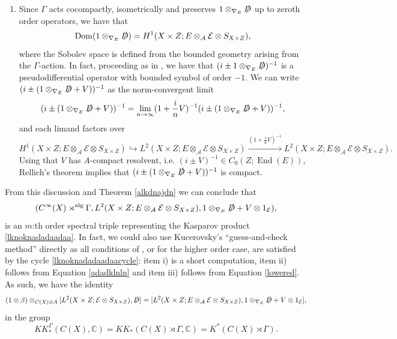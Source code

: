 \documentclass[a4paper,reqno]{amsart}
\numberwithin{equation}{section}
\def\End{\operatorname{End}}
\def\Dom{\operatorname{Dom}}
\def\C{\mathbb{C}}
\theoremstyle{definition}
\theoremstyle{remark}
\begin{document}
\begin{enumerate}
\item Since $\Gamma$ acts cocompactly, isometrically and preserves $1\otimes_{\nabla_E}\slashed{D}$ up to zeroth order operators, we have that 
$$\Dom(1\otimes_{\nabla_E}\slashed{D})=H^1(X\times Z;E\otimes_{\mathcal{A}} \mathcal{E}\otimes S_{X\times Z}),$$
where the Sobolev space is defined from the bounded geometry arising from the $\Gamma$-action. In fact, proceeding as in \cite{boundedgeome}, we have that $(i\pm 1\otimes_{\nabla_E}\slashed{D})^{-1}$ is a pseudodifferential operator with bounded symbol of order $-1$. We can write $(i\pm (1\otimes_{\nabla_E}\slashed{D}+V))^{-1}$ as the norm-convergent limit
$$(i\pm (1\otimes_{\nabla_E}\slashed{D}+V))^{-1}=\lim_{n\to \infty} (1+\frac{i}{n}V)^{-1}(i\pm (1\otimes_{\nabla_E}\slashed{D}+V))^{-1},$$
and each limand factors over 
$$H^1(X\times Z;E\otimes_{\mathcal{A}} \mathcal{E}\otimes S_{X\times Z})\hookrightarrow L^2(X\times Z;E\otimes_{\mathcal{A}} \mathcal{E}\otimes S_{X\times Z})\xrightarrow{(1+\frac{i}{n}V)^{-1}}L^2(X\times Z;E\otimes_{\mathcal{A}} \mathcal{E}\otimes S_{X\times Z}).$$
Using that $V$ has $A$-compact resolvent, i.e. $(i\pm V)^{-1}\in C_0(Z;\End(E))$, Rellich's theorem implies that $(i\pm (1\otimes_{\nabla_E}\slashed{D}+V))^{-1}$ is compact. 
\end{enumerate}


From this discussion and Theorem \ref{alkdnajdn} we can conclude that 
\begin{equation}
\label{dadlkaldkn}
(C^\infty(X)\rtimes^{\rm alg}\Gamma, L^2(X\times Z;E\otimes_{\mathcal{A}} \mathcal{E}\otimes S_{X\times Z}),1\otimes_{\nabla_E}\slashed{D}+V\otimes 1_{\mathcal{E}}),
\end{equation}
is an $m$:th order spectral triple representing the Kasparov product \eqref{lknoknadadaadaa}. In fact, we could also use Kucerovsky's ``guess-and-check method'' directly as all conditions of \cite[Theorem 13]{dantheman}, or \cite[Theorem A.7]{GM15} for the higher order case, are satisfied by the cycle \eqref{lknoknadadaadaacycle}: item i) is a short computation, item ii) follows from Equation \eqref{adadklnln} and item iii) follows from Equation \eqref{lowered}. As such, we have the identity 
$$(1\otimes \beta)\otimes_{C(X)\otimes A} [L^2(X\times Z;\mathcal{E}\otimes S_{X\times Z}),\slashed{D}]
=[L^2(X\times Z;E\otimes_{\mathcal{A}} \mathcal{E}\otimes S_{X\times Z}),1\otimes_{\nabla_E}\slashed{D}+V\otimes 1_{\mathcal{E}}],$$
in the group 
$$KK_*^\Gamma(C(X),\C)=KK_*(C(X)\rtimes \Gamma,\C)=K^*(C(X)\rtimes \Gamma).$$
\end{document}
